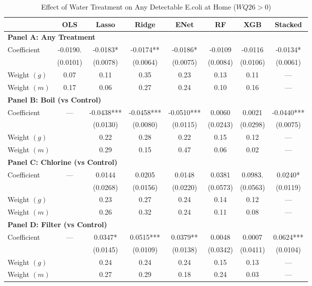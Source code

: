 \begin{table}[htbp]
\centering
\caption{Effect of Water Treatment on Any Detectable E.coli at Home ($WQ26>0$)}
\label{tab:some_risk_home_full}
\begin{tabular}{lccccccc}
\toprule
 & OLS & Lasso & Ridge & ENet & RF & XGB & Stacked \\
\midrule
\multicolumn{8}{l}{\textbf{Panel A: Any Treatment}} \\
\midrule
Coefficient & -0.0190. & -0.0183* & -0.0174** & -0.0186* & -0.0109 & -0.0116 & -0.0134* \\
 & (0.0101) & (0.0078) & (0.0064) & (0.0075) & (0.0084) & (0.0106) & (0.0061) \\
Weight $(g)$ & 0.07 & 0.11 & 0.35 & 0.23 & 0.13 & 0.11 & — \\
Weight $(m)$ & 0.17 & 0.06 & 0.27 & 0.24 & 0.10 & 0.16 & — \\

\multicolumn{8}{l}{\textbf{Panel B: Boil (vs Control)}} \\
\midrule
Coefficient & --- & -0.0438*** & -0.0458*** & -0.0510*** & 0.0060 & 0.0021 & -0.0440*** \\
 &  & (0.0130) & (0.0080) & (0.0115) & (0.0243) & (0.0298) & (0.0075) \\
Weight $(g)$ &  & 0.22 & 0.28 & 0.22 & 0.15 & 0.12 & — \\
Weight $(m)$ &  & 0.29 & 0.15 & 0.47 & 0.06 & 0.02 & — \\

\multicolumn{8}{l}{\textbf{Panel C: Chlorine (vs Control)}} \\
\midrule
Coefficient & --- & 0.0144 & 0.0205 & 0.0148 & 0.0381 & 0.0983. & 0.0240* \\
 &  & (0.0268) & (0.0156) & (0.0220) & (0.0573) & (0.0563) & (0.0119) \\
Weight $(g)$ &  & 0.23 & 0.27 & 0.24 & 0.14 & 0.12 & — \\
Weight $(m)$ &  & 0.26 & 0.32 & 0.24 & 0.11 & 0.08 & — \\

\multicolumn{8}{l}{\textbf{Panel D: Filter (vs Control)}} \\
\midrule
Coefficient & --- & 0.0347* & 0.0515*** & 0.0379** & 0.0048 & 0.0007 & 0.0624*** \\
 &  & (0.0145) & (0.0109) & (0.0138) & (0.0342) & (0.0411) & (0.0104) \\
Weight $(g)$ &  & 0.24 & 0.24 & 0.24 & 0.15 & 0.13 & — \\
Weight $(m)$ &  & 0.27 & 0.29 & 0.18 & 0.24 & 0.03 & — \\


\end{tabular}
\end{table}
